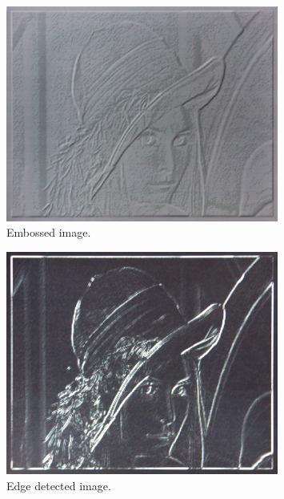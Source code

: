 \begin{figure}[h]
  \centering
  \includegraphics[width=0.8\textwidth]{gfx/results/lenna_embossed}
  \caption{Embossed image.}
  \label{fig:lenna_embossed}
\end{figure}

\begin{figure}[h]
  \centering
  \includegraphics[width=0.8\textwidth]{gfx/results/lenna_edge_detected}
  \caption{Edge detected image.}
  \label{fig:lenna_edge_detected}
\end{figure}
